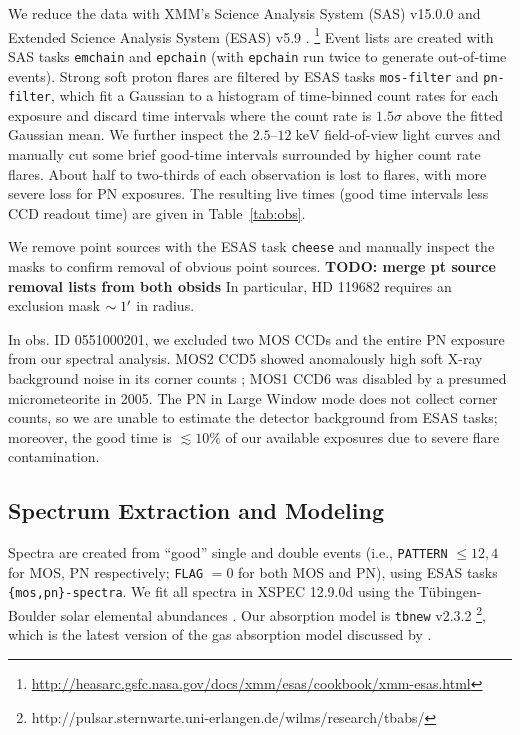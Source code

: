 \documentclass[preprint2,tighten,trackchanges]{aastex6}
\newcommand*{\mt}{\mathrm}
\newcommand*{\unit}[1]{\;\mt{#1}}  %
\begin{document}
We reduce the data with XMM's Science Analysis System (SAS) v15.0.0 and
Extended Science Analysis System (ESAS) v5.9 \citep{snowden2008, kuntz2008}.
\footnote{\href{http://heasarc.gsfc.nasa.gov/docs/xmm/esas/cookbook/xmm-esas.html}{http://heasarc.gsfc.nasa.gov/docs/xmm/esas/cookbook/xmm-esas.html}}
Event lists are created with SAS tasks \texttt{emchain} and \texttt{epchain}
(with \texttt{epchain} run twice to generate out-of-time events).
Strong soft proton flares are filtered by ESAS tasks \texttt{mos-filter} and
\texttt{pn-filter}, which fit a Gaussian to a histogram of time-binned count
rates for each exposure and discard time intervals where the count rate is
$1.5\sigma$ above the fitted Gaussian mean.  %
We further inspect the $2.5$--$12 \unit{keV}$ field-of-view light curves and
manually cut some brief good-time intervals surrounded by higher count rate
flares.
About half to two-thirds of each observation is lost to flares, with more
severe loss for PN exposures.
The resulting live times (good time intervals less CCD readout time) are
given in Table~\ref{tab:obs}.

We remove point sources with the ESAS task \texttt{cheese} and manually inspect
the masks to confirm removal of obvious point sources.
\textbf{TODO: merge pt source removal lists from both obsids}  %
In particular, HD 119682 requires an exclusion mask $\sim 1\mbox{$^\prime$}$ in radius.

In obs. ID 0551000201, we excluded two MOS CCDs and the entire PN exposure from
our spectral analysis.
MOS2 CCD5 showed anomalously high soft X-ray background noise in its corner
counts \citep[cf.][]{kuntz2008}; MOS1 CCD6 was disabled by a presumed
micrometeorite in 2005.
The PN in Large Window mode does not collect corner counts, so we are unable to
estimate the detector background from ESAS tasks; moreover, the good time is
$\lesssim 10\%$ of our available exposures due to severe flare contamination.


\subsection{Spectrum Extraction and Modeling}

Spectra are created from ``good'' single and double events (i.e.,
\texttt{PATTERN} $\leq 12,4$ for MOS, PN respectively; \texttt{FLAG} $= 0$ for
both MOS and PN), using ESAS tasks \texttt{\{mos,pn\}-spectra}.
We fit all spectra in XSPEC 12.9.0d \citep{arnaud1996}
using the T{\"u}bingen-Boulder solar elemental abundances
\citep{wilms2000}.
Our absorption model is \texttt{tbnew} v2.3.2
\footnote{http://pulsar.sternwarte.uni-erlangen.de/wilms/research/tbabs/},
which is the latest version of the gas absorption model discussed by
\citet{wilms2000}.
\end{document}
